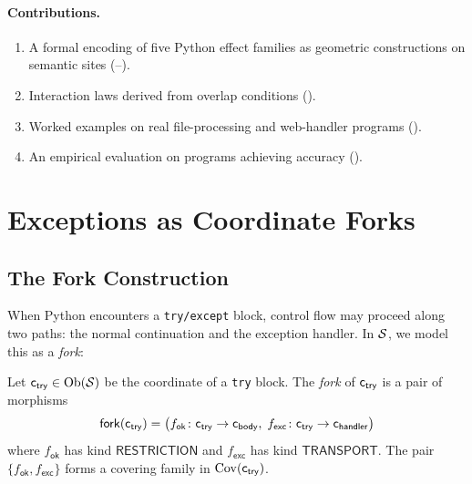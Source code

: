 \documentclass[11pt]{article}
\newcommand{\fork}{\mathsf{fork}}        %
\begin{document}
\paragraph{Contributions.}
\begin{enumerate}[nosep]
\item A formal encoding of five Python effect families as geometric
  constructions on semantic sites (--).
\item Interaction laws derived from overlap conditions
  ().
\item Worked examples on real file-processing and web-handler programs
  ().
\item An empirical evaluation on \expTotalPrograms{} programs achieving
  \expAccuracy{} accuracy ().
\end{enumerate}

\section{Exceptions as Coordinate Forks}\label{sec:exceptions}

\subsection{The Fork Construction}

When Python encounters a \texttt{try/except} block, control flow may
proceed along two paths: the normal continuation and the exception
handler.  In $\mathcal{S}$, we model this as a \emph{fork}:

\begin{definition}\label{def:fork}
Let $\mathsf{c}_{\mathsf{try}} \in \mathrm{Ob}(\mathcal{S})$ be the coordinate of a
\texttt{try} block.  The \emph{fork} of $\mathsf{c}_{\mathsf{try}}$ is a
pair of morphisms
\[
  \fork(\coord_{\mathsf{try}}) =
  \bigl(
    f_{\mathsf{ok}} \colon \coord_{\mathsf{try}} \to \coord_{\mathsf{body}},\;
    f_{\mathsf{exc}} \colon \coord_{\mathsf{try}} \to \coord_{\mathsf{handler}}
  \bigr)
\]
where $f_{\mathsf{ok}}$ has kind $\mathsf{RESTRICTION}$ and
$f_{\mathsf{exc}}$ has kind $\mathsf{TRANSPORT}$.  The pair
$\{f_{\mathsf{ok}}, f_{\mathsf{exc}}\}$ forms a covering family
in $\mathrm{Cov}(\mathsf{c}_{\mathsf{try}})$.
\end{definition}
\end{document}
